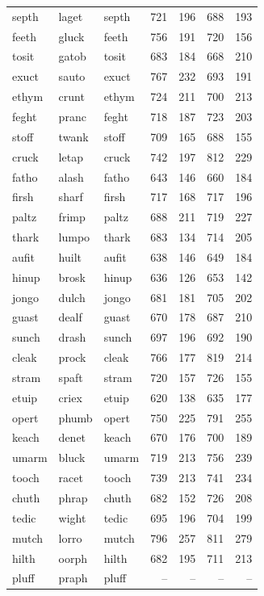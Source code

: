 \documentclass[
]{interact}
\begin{document}
\begin{longtable*}{lllrrrr}
septh & laget & septh & 721 & 196 & 688 & 193 \\ 
feeth & gluck & feeth & 756 & 191 & 720 & 156 \\ 
tosit & gatob & tosit & 683 & 184 & 668 & 210 \\ 
exuct & sauto & exuct & 767 & 232 & 693 & 191 \\ 
ethym & crunt & ethym & 724 & 211 & 700 & 213 \\ 
feght & pranc & feght & 718 & 187 & 723 & 203 \\ 
stoff & twank & stoff & 709 & 165 & 688 & 155 \\ 
cruck & letap & cruck & 742 & 197 & 812 & 229 \\ 
fatho & alash & fatho & 643 & 146 & 660 & 184 \\ 
firsh & sharf & firsh & 717 & 168 & 717 & 196 \\ 
paltz & frimp & paltz & 688 & 211 & 719 & 227 \\ 
thark & lumpo & thark & 683 & 134 & 714 & 205 \\ 
aufit & huilt & aufit & 638 & 146 & 649 & 184 \\ 
hinup & brosk & hinup & 636 & 126 & 653 & 142 \\ 
jongo & dulch & jongo & 681 & 181 & 705 & 202 \\ 
guast & dealf & guast & 670 & 178 & 687 & 210 \\ 
sunch & drash & sunch & 697 & 196 & 692 & 190 \\ 
cleak & prock & cleak & 766 & 177 & 819 & 214 \\ 
stram & spaft & stram & 720 & 157 & 726 & 155 \\ 
etuip & criex & etuip & 620 & 138 & 635 & 177 \\ 
opert & phumb & opert & 750 & 225 & 791 & 255 \\ 
keach & denet & keach & 670 & 176 & 700 & 189 \\ 
umarm & bluck & umarm & 719 & 213 & 756 & 239 \\ 
tooch & racet & tooch & 739 & 213 & 741 & 234 \\ 
chuth & phrap & chuth & 682 & 152 & 726 & 208 \\ 
tedic & wight & tedic & 695 & 196 & 704 & 199 \\ 
mutch & lorro & mutch & 796 & 257 & 811 & 279 \\ 
hilth & oorph & hilth & 682 & 195 & 711 & 213 \\ 
pluff & praph & pluff & – & – & – & – \\ 

\end{longtable*}
\end{document}
